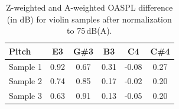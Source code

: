 \begin{table}[!ht]
\caption{Z-weighted and A-weighted OASPL difference (in dB) for violin samples after normalization to $75\,$dB(A).}
\vskip3pt
\setlength{\tabcolsep}{6pt}
\begin{tabular}{l|ccccc}
\hline\hline
Pitch & E3 & G\#3 & B3 & C4 & C\#4 \\
\hline
Sample 1 & 0.92 & 0.67 & 0.31 & -0.08 & 0.27 \\
Sample 2 & 0.74 & 0.85 & 0.17 & -0.02 & 0.20 \\
Sample 3 & 0.63 & 0.91 & 0.13 & -0.05 & 0.20 \\
\hline\hline
\end{tabular}
\label{violinaz}
\end{table}
